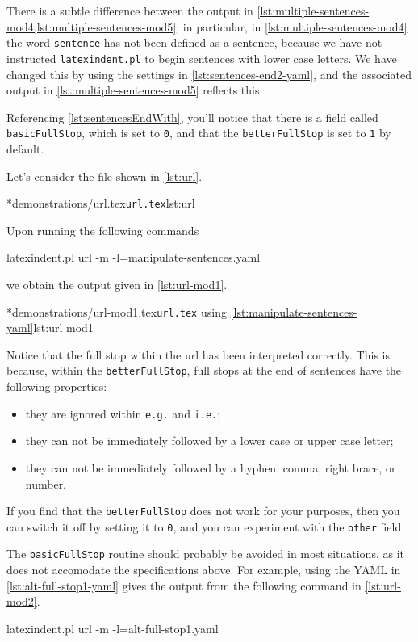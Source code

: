 	There is a subtle difference between the output in \cref{lst:multiple-sentences-mod4,lst:multiple-sentences-mod5}; in particular,
	in \cref{lst:multiple-sentences-mod4} the word \texttt{sentence} has not been defined as a sentence, because we have not instructed
	\texttt{latexindent.pl} to begin sentences with lower case letters. We have changed this by using the settings in \cref{lst:sentences-end2-yaml},
	and the associated output in \cref{lst:multiple-sentences-mod5} reflects this.

    Referencing \vref{lst:sentencesEndWith}, you'll notice that there is a field called \texttt{basicFullStop}, which 
    is set to \texttt{0}, and that the \texttt{betterFullStop} is set to \texttt{1} by default.

	Let's consider the file shown in \cref{lst:url}.

	\cmhlistingsfromfile*[showspaces=false]*{demonstrations/url.tex}{\texttt{url.tex}}{lst:url}

	Upon running the following commands
	\begin{commandshell}
latexindent.pl url -m -l=manipulate-sentences.yaml
\end{commandshell}
	we obtain the output given in \cref{lst:url-mod1}.

	\cmhlistingsfromfile*[showspaces=false]*{demonstrations/url-mod1.tex}{\texttt{url.tex} using \vref{lst:manipulate-sentences-yaml}}{lst:url-mod1}

    Notice that the full stop within the url has been interpreted correctly. This is because, within the \texttt{betterFullStop}, 
    full stops at the end of sentences have the following properties:
    \begin{itemize}
      \item they are ignored within \texttt{e.g.} and \texttt{i.e.};
      \item they can not be immediately followed by a lower case or upper case letter;
      \item they can not be immediately followed by a hyphen, comma, right brace, or number.
    \end{itemize}
    If you find that the \texttt{betterFullStop} does not work for your purposes, then you can switch it off by setting 
    it to \texttt{0}, and you can experiment with the \texttt{other} field. 

    The \texttt{basicFullStop} routine should probably be avoided in most situations, as it does not accomodate the specifications
    above. For example, using the YAML in \cref{lst:alt-full-stop1-yaml} gives the output from the following command in \cref{lst:url-mod2}.
	\begin{commandshell}
latexindent.pl url -m -l=alt-full-stop1.yaml
\end{commandshell}


